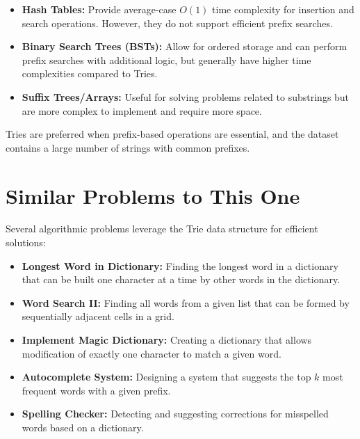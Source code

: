 \begin{itemize}
    \item \textbf{Hash Tables:} Provide average-case \(O(1)\) time complexity for insertion and search operations. However, they do not support efficient prefix searches.
    
    \item \textbf{Binary Search Trees (BSTs):} Allow for ordered storage and can perform prefix searches with additional logic, but generally have higher time complexities compared to Tries.
    
    \item \textbf{Suffix Trees/Arrays:} Useful for solving problems related to substrings but are more complex to implement and require more space.
\end{itemize}

Tries are preferred when prefix-based operations are essential, and the dataset contains a large number of strings with common prefixes.

\section*{Similar Problems to This One}

Several algorithmic problems leverage the Trie data structure for efficient solutions:

\begin{itemize}
    \item \textbf{Longest Word in Dictionary:} Finding the longest word in a dictionary that can be built one character at a time by other words in the dictionary.
    
    \item \textbf{Word Search II:} Finding all words from a given list that can be formed by sequentially adjacent cells in a grid.
    
    \item \textbf{Implement Magic Dictionary:} Creating a dictionary that allows modification of exactly one character to match a given word.
    
    \item \textbf{Autocomplete System:} Designing a system that suggests the top \(k\) most frequent words with a given prefix.
    
    \item \textbf{Spelling Checker:} Detecting and suggesting corrections for misspelled words based on a dictionary.
\end{itemize}

